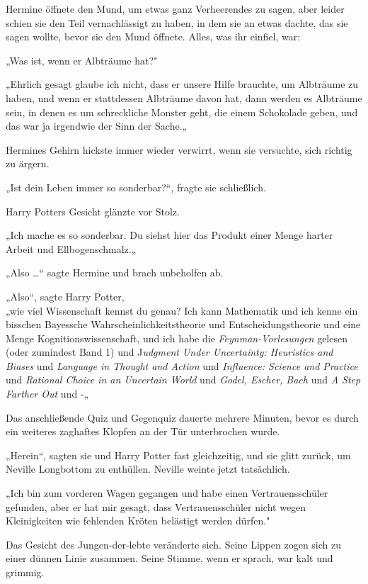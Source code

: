 {Hermine öffnete den Mund, um etwas ganz Verheerendes zu sagen, aber leider schien sie den Teil vernachlässigt zu haben, in dem sie an etwas dachte, das sie sagen wollte, bevor sie den Mund öffnete. Alles, was ihr einfiel, war:

„Was ist, wenn er Albträume hat?"

„Ehrlich gesagt glaube ich nicht, dass er unsere Hilfe brauchte, um Albträume zu haben, und wenn er stattdessen Albträume davon hat, dann werden es Albträume sein, in denen es um schreckliche Monster geht, die einem Schokolade geben, und das war ja irgendwie der Sinn der Sache.„

Hermines Gehirn hickste immer wieder verwirrt, wenn sie versuchte, sich richtig zu ärgern.

„Ist dein Leben immer so sonderbar?“, fragte sie schließlich.

Harry Potters Gesicht glänzte vor Stolz.

„Ich mache es so sonderbar. Du siehst hier das Produkt einer Menge harter Arbeit und Ellbogenschmalz.„

„Also …“ sagte Hermine und brach unbeholfen ab.

„Also“, sagte Harry Potter,\\ „wie viel Wissenschaft kennst du genau? Ich kann Mathematik und ich kenne ein bisschen Bayessche Wahrscheinlichkeitstheorie und Entscheidungstheorie und eine Menge Kognitionswissenschaft, und ich habe die \emph{Feynman-Vorlesungen} gelesen (oder zumindest Band 1) und J\emph{udgment Under Uncertainty: Heuristics and Biases} und \emph{Language in Thought and Action} und \emph{Influence: Science and Practice} und \emph{Rational Choice in an Uncertain World} und \emph{Godel, Escher, Bach} und \emph{A Step Farther Out} und -„

Das anschließende Quiz und Gegenquiz dauerte mehrere Minuten, bevor es durch ein weiteres zaghaftes Klopfen an der Tür unterbrochen wurde.

„Herein“, sagten sie und Harry Potter fast gleichzeitig, und sie glitt zurück, um Neville Longbottom zu enthüllen. Neville weinte jetzt tatsächlich.

„Ich bin zum vorderen Wagen gegangen und habe einen Vertrauensschüler gefunden, aber er hat mir gesagt, dass Vertrauensschüler nicht wegen Kleinigkeiten wie fehlenden Kröten belästigt werden dürfen."

Das Gesicht des Jungen-der-lebte veränderte sich. Seine Lippen zogen sich zu einer dünnen Linie zusammen. Seine Stimme, wenn er sprach, war kalt und grimmig.

}

